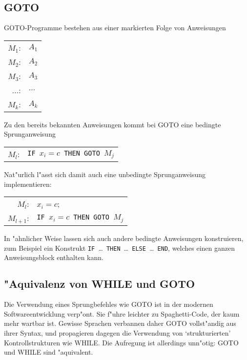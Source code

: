 \subsection{GOTO}
GOTO-Programme bestehen aus einer markierten Folge von Anweisungen
\begin{center}
\begin{tabular}{rl}
$M_1$:&$A_1$\\
$M_2$:&$A_2$\\
$M_3$:&$A_3$\\
$\dots$:&$\dots$\\
$M_k$:&$A_k$
\end{tabular}
\end{center}
Zu den bereits bekannten Anweisungen kommt bei GOTO eine bedingte
Sprunganweisung
\begin{center}
\begin{tabular}{rl}
$M_l$:&{\tt IF\ }$x_i=c${\tt\ THEN GOTO\ }$M_j$
\end{tabular}
\end{center}
Nat"urlich l"asst sich damit auch eine unbedingte Sprunganweisung
implementieren:
\begin{center}
\begin{tabular}{rl}
$M_l$:&$x_i=c$;\\
$M_{l+1}$:&{\tt IF\ }$x_i=c${\tt\ THEN GOTO\ }$M_j$
\end{tabular}
\end{center}
In "ahnlicher Weise lassen sich auch andere bedingte Anweisungen
konstruieren, zum Beispiel ein
Konstrukt {\tt IF }\dots{\tt\ THEN }\dots{\tt\ ELSE }\dots{\tt\ END}, welches
einen ganzen Anweisungsblock enthalten kann.

\subsection{"Aquivalenz von WHILE und GOTO}
Die Verwendung eines Sprungbefehles wie GOTO ist in der modernen
Softwareentwicklung verp"ont. Sie f"uhre leichter zu Spaghetti-Code,
der kaum mehr wartbar ist. Gewisse Sprachen verbannen daher
GOTO vollst"andig aus ihrer Syntax, und propagieren dagegen
die Verwendung von `strukturierten' Kontrollstrukturen wie
WHILE. Die Aufregung ist allerdings unn"otig: GOTO und WHILE sind "aquivalent.


